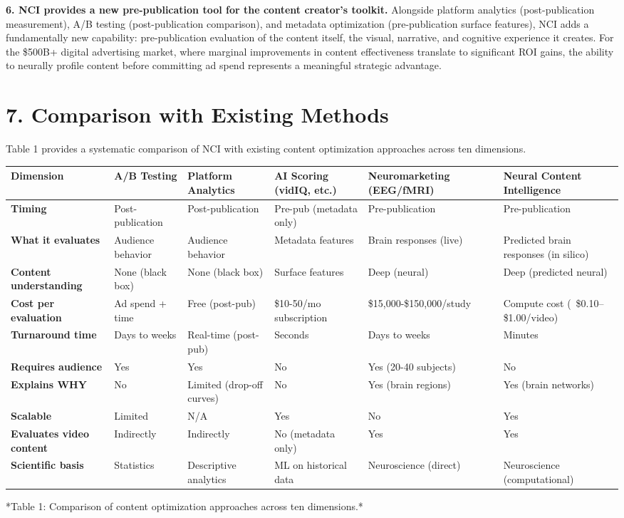 \documentclass[11pt,letterpaper]{article}
\begin{document}
\textbf{6. NCI provides a new pre-publication tool for the content creator's toolkit.} Alongside platform analytics (post-publication measurement), A/B testing (post-publication comparison), and metadata optimization (pre-publication surface features), NCI adds a fundamentally new capability: pre-publication evaluation of the content itself, the visual, narrative, and cognitive experience it creates. For the \$500B+ digital advertising market, where marginal improvements in content effectiveness translate to significant ROI gains, the ability to neurally profile content before committing ad spend represents a meaningful strategic advantage.


\section{7. Comparison with Existing Methods}

Table 1 provides a systematic comparison of NCI with existing content optimization approaches across ten dimensions.

\begin{table}[htbp]
\centering
\small
\begin{tabular}{|p{}|p{}|p{}|p{}|p{}|p{}|}
\hline
Dimension & A/B Testing & Platform Analytics & AI Scoring (vidIQ, etc.) & Neuromarketing (EEG/fMRI) & Neural Content Intelligence \\
\hline
\textbf{Timing} & Post-publication & Post-publication & Pre-pub (metadata only) & Pre-publication & Pre-publication \\
\textbf{What it evaluates} & Audience behavior & Audience behavior & Metadata features & Brain responses (live) & Predicted brain responses (in silico) \\
\textbf{Content understanding} & None (black box) & None (black box) & Surface features & Deep (neural) & Deep (predicted neural) \\
\textbf{Cost per evaluation} & Ad spend + time & Free (post-pub) & \$10-50/mo subscription & \$15,000-\$150,000/study & Compute cost (~\$0.10--\$1.00/video) \\
\textbf{Turnaround time} & Days to weeks & Real-time (post-pub) & Seconds & Days to weeks & Minutes \\
\textbf{Requires audience} & Yes & Yes & No & Yes (20-40 subjects) & No \\
\textbf{Explains WHY} & No & Limited (drop-off curves) & No & Yes (brain regions) & Yes (brain networks) \\
\textbf{Scalable} & Limited & N/A & Yes & No & Yes \\
\textbf{Evaluates video content} & Indirectly & Indirectly & No (metadata only) & Yes & Yes \\
\textbf{Scientific basis} & Statistics & Descriptive analytics & ML on historical data & Neuroscience (direct) & Neuroscience (computational) \\
\hline
\end{tabular}
\end{table}
*Table 1: Comparison of content optimization approaches across ten dimensions.*
\end{document}
